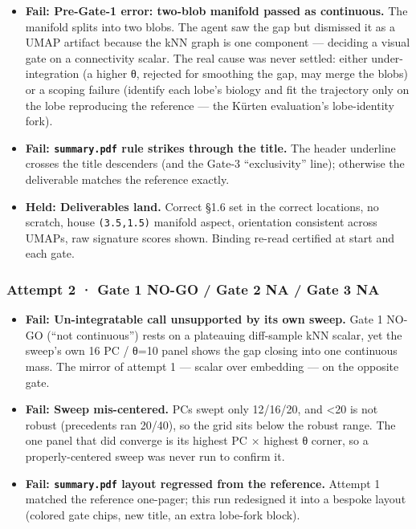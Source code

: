 \documentclass[11pt,a4paper]{article}
\providecommand{\tightlist}{\setlength{\itemsep}{0pt}\setlength{\parskip}{0pt}}
\begin{document}
\begin{itemize}
\tightlist
\item
  \textbf{Fail: Pre-Gate-1 error: two-blob manifold passed as
  continuous.} The manifold splits into two blobs. The agent saw the gap
  but dismissed it as a UMAP artifact because the kNN graph is one
  component --- deciding a visual gate on a connectivity scalar. The
  real cause was never settled: either under-integration (a higher θ,
  rejected for smoothing the gap, may merge the blobs) or a scoping
  failure (identify each lobe's biology and fit the trajectory only on
  the lobe reproducing the reference --- the Kürten evaluation's
  lobe-identity fork).
\item
  \textbf{Fail: \texttt{summary.pdf} rule strikes through the title.}
  The header underline crosses the title descenders (and the Gate-3
  ``exclusivity'' line); otherwise the deliverable matches the reference
  exactly.
\item
  \textbf{Held: Deliverables land.} Correct §1.6 set in the
  correct locations, no scratch, house \texttt{(3.5,1.5)} manifold
  aspect, orientation consistent across UMAPs, raw signature scores
  shown. Binding re-read certified at start and each gate.
\end{itemize}

\hypertarget{attempt-2-gate-1-no-go-gate-2-na-gate-3-na}{%
\subsubsection{Attempt 2 · Gate 1 NO-GO / Gate 2 NA / Gate 3
NA}\label{attempt-2-gate-1-no-go-gate-2-na-gate-3-na}}

\begin{itemize}
\tightlist
\item
  \textbf{Fail: Un-integratable call unsupported by its own sweep.}
  Gate 1 NO-GO (``not continuous'') rests on a plateauing diff-sample
  kNN scalar, yet the sweep's own 16 PC / θ=10 panel shows the gap
  closing into one continuous mass. The mirror of attempt 1 --- scalar
  over embedding --- on the opposite gate.
\item
  \textbf{Fail: Sweep mis-centered.} PCs swept only 12/16/20, and
  \textless20 is not robust (precedents ran 20/40), so the grid sits
  below the robust range. The one panel that did converge is its highest
  PC × highest θ corner, so a properly-centered sweep was never run to
  confirm it.
\item
  \textbf{Fail: \texttt{summary.pdf} layout regressed from the
  reference.} Attempt 1 matched the reference one-pager; this run
  redesigned it into a bespoke layout (colored gate chips, new title, an
  extra lobe-fork block).
\end{itemize}
\end{document}
